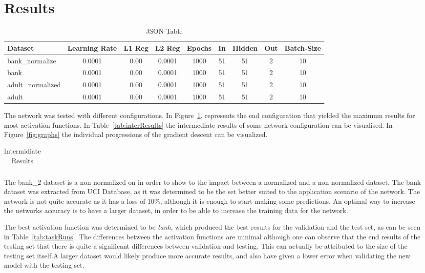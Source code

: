 \documentclass[12pt]{article}
\begin{document}
\section{Results}
\label{sec:results}

\begin{table}[h]
   \centering
   \caption{JSON-Table}
   \label{tab:JSON}
   \begin{tabular}{lcccccccc}\toprule
        Dataset & Learning Rate & L1 Reg & L2 Reg & Epochs & In & Hidden & Out & Batch-Size \\
        \midrule
        bank\_normalize & 0.0001 & 0.00 & 0.0001 & 1000 & 51 & 51 & 2 & 10 \\
        bank & 0.0001 & 0.00 & 0.0001 & 1000 & 51 & 51 & 2 & 10 \\
        adult\_normalized & 0.0001 & 0.00 & 0.0001 & 1000 & 51 & 51 & 2 & 10 \\
        adult & 0.0001 & 0.00 & 0.0001 & 1000 & 51 & 51 & 2 & 10 \\ 
        \bottomrule
   \end{tabular}
\end{table}
The network was tested with different configurations. In Figure~\ref{tab:JSON}, represents the end configuration that yielded the maximum results for most activation functions. In Table~\ref{tab:interResults} the intermediate results of some network configuration can be visualised. In Figure~\ref{fig:graphs} the individual progressions of the gradient descent can be visualized.

\begin{table}[h]
    \centering
    \caption{Intermidiate Results}
    \label{tab:label}
    \begin{tabular}{c}
    
    \end{tabular}
\end{table}

The bank\_2 dataset is a non normalized on in order to show to the impact between a normalized and a non normalized dataset. The bank dataset was extracted from UCI Database, as it was determined to be the set better suited to the application scenario of the network. The network is not quite accurate as it has a loss of 10\%, although it is enough to start making some predictions. An optimal way to increase the networks accuracy is to have a larger dataset, in order to be able to increase the training data for the network. 

The best activation function was determined to be \emph{tanh}, which produced the best results for the validation and the test set, as can be seen in Table~\ref{tab:taskRuns}. The differences between the activation functions are minimal although one can observe that the end results of the testing set that there is quite a significant differences between validation and testing. This can actually be attributed to the size of the testing set itself.A larger dataset would likely produce more accurate results, and also have given a lower error when validating the new model with the testing set.
\end{document}
